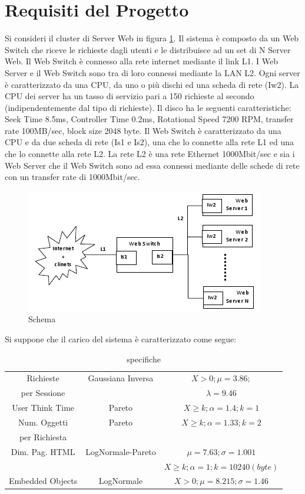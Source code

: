 \section{Requisiti del Progetto}
Si consideri il cluster di Server Web in figura \ref{schema1}. Il sistema è composto da un Web Switch che riceve le richieste dagli utenti e le distribuisce ad un set di N Server Web. Il Web Switch è connesso alla rete internet mediante il link L1. I Web Server e il Web Switch sono tra di loro connessi mediante la LAN L2. 
Ogni server è caratterizzato da una CPU, da uno o più dischi ed una scheda di rete (Iw2). La CPU dei server ha un tasso di servizio pari a 150 richieste al secondo (indipendentemente dal tipo di richieste). Il disco ha le seguenti caratteristiche: Seek Time 8.5ms, Controller Time 0.2ms, Rotational Speed 7200 RPM, transfer rate 100MB/sec, block size 2048 byte. 
Il Web Switch è caratterizzato da una CPU e da due scheda di rete (Is1 e Is2), una che lo connette alla rete L1 ed una che lo connette alla rete L2. 
La rete L2 è una rete Ethernet 1000Mbit/sec e sia i Web Server che il Web Switch sono ad essa connessi mediante delle schede di rete con un transfer rate di 1000Mbit/sec. 
\begin{figure}[H]
\begin{center}
\includegraphics[scale=1.2]{etc/schema1.png}
\caption{Schema}
\label{schema1}
\end{center}
\end{figure}
Si suppone che il carico del sistema è caratterizzato come segue:
\begin{table}[H]
\begin{center}
\begin{tabular}{||c|c|c||}
\hline
Richieste 	&Gaussiana Inversa			&$X > 0; \mu = 3.86;$\\
per Sessione & 							&$\lambda = 9.46$\\
\hline
\hline
User Think Time				&Pareto		&$X \geq k; \alpha=1.4; k = 1$\\
\hline
Num. Oggetti 	&Pareto		&$X \geq k; \alpha=1.33; k = 2$\\
per Richiesta	&			&\\							
\hline
Dim. Pag. HTML	&LogNormale-Pareto	&$\mu = 7.63; \sigma = 1.001$ \\
					&					&$X \geq k; \alpha=1; k = 10240 (byte)$\\
\hline
Embedded Objects	&LogNormale			&$X > 0; \mu = 8.215; \sigma = 1.46$\\
\hline
\end{tabular}
\end{center}
\caption{specifiche}
\label{test_1}
\end{table}
